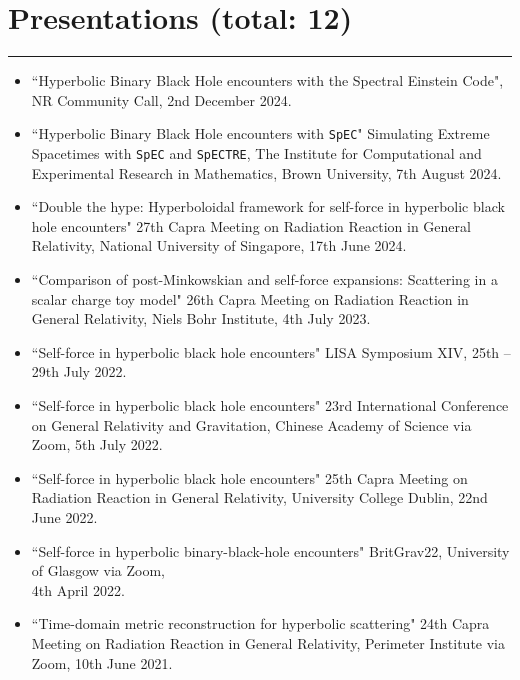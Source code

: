 \documentclass[10.5pt, oneside]{article}   	%
\begin{document}
 \newpage
 {\color{Sectioncolour}
\section*{Presentations {\rm (total: 12)}}
\vspace{-3mm}
\noindent\rule{\linewidth}{0.6pt}}
\begin{itemize}
\item ``Hyperbolic Binary Black Hole encounters with the Spectral Einstein Code", NR Community Call, 2nd December 2024.
\item ``Hyperbolic Binary Black Hole encounters with \texttt{SpEC}" Simulating Extreme Spacetimes with \texttt{SpEC} and \texttt{SpECTRE}, The Institute for Computational and Experimental Research in Mathematics, Brown University, 7th August 2024.
\item ``Double the hype: Hyperboloidal framework for self-force in hyperbolic black hole encounters" 27th Capra Meeting on Radiation Reaction in General Relativity, National University of Singapore, 17th June 2024.
\item ``Comparison of post-Minkowskian and self-force expansions: Scattering in a scalar charge toy model" 26th Capra Meeting on Radiation Reaction in General Relativity, Niels Bohr Institute, 4th July 2023.
\item ``Self-force in hyperbolic black hole encounters" LISA Symposium XIV, 25th -- 29th July 2022. \href{https://www.youtube.com/watch?v=p2-RgYB6Jhk}{}
\item ``Self-force in hyperbolic black hole encounters" 23rd International Conference on General Relativity and Gravitation, Chinese Academy of Science via Zoom, 5th July 2022. \href{https://www.koushare.com/video/videodetail/30159}{}
\item ``Self-force in hyperbolic black hole encounters" 25th Capra Meeting on Radiation Reaction in General Relativity, University College Dublin, 22nd June 2022. \href{https://oliverlong.info/talks/capra25}{}
\item ``Self-force in hyperbolic binary-black-hole encounters" BritGrav22, University of Glasgow via Zoom, \\ 4th April 2022. \href{https://www.youtube.com/watch?v=zZEblkjb5IM}{}
\item ``Time-domain metric reconstruction for hyperbolic scattering" 24th Capra Meeting on Radiation Reaction in General Relativity, Perimeter Institute via Zoom, 10th June 2021. \href{https://pirsa.org/21060058}{}

\end{itemize}
\end{document}

